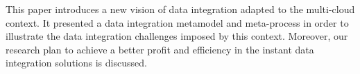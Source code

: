This paper introduces a new vision of data integration adapted to the multi-cloud context. It presented a data integration metamodel and meta-process in order to illustrate the data integration challenges imposed by this context. Moreover, our research plan to achieve a better profit and efficiency in the instant data integration solutions is discussed.


